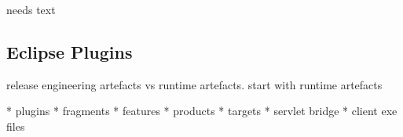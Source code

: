 \documentclass[a4paper,10pt,twoside]{book}
\begin{document}
needs text

\subsection{Eclipse Plugins}

release engineering artefacts vs runtime artefacts. start with runtime artefacts

  * plugins
  * fragments
  * features
  * products
  * targets
  * servlet bridge
  * client exe files
  
  
\ifx\wholebook\relax\else
   
   
\end{document}
